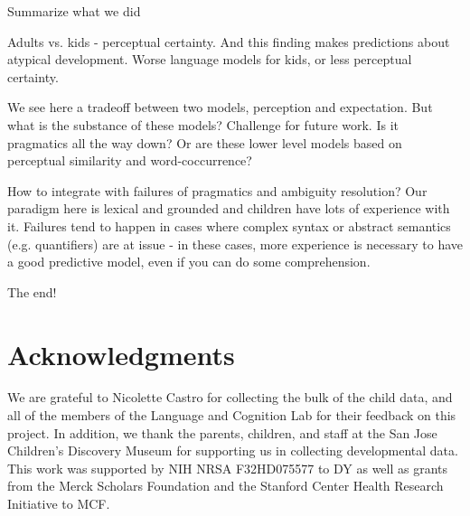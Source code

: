 \documentclass[man,floatsintext]{apa6}
\begin{document}
Summarize what we did

Adults vs. kids - perceptual certainty. And this finding makes predictions about atypical development. Worse language models for kids, or less perceptual certainty. 

We see here a tradeoff between two models, perception and expectation. But what is the substance of these models? Challenge for future work. Is it pragmatics all the way down? Or are these lower level models based on perceptual similarity and word-coccurrence?

How to integrate with failures of pragmatics and ambiguity resolution? Our paradigm here is lexical and grounded and children have lots of experience with it. Failures tend to happen in cases where complex syntax or abstract semantics (e.g. quantifiers) are at issue - in these cases, more experience is necessary to have a good predictive model, even if you can do some comprehension. 

The end!

\section{Acknowledgments}

We are grateful to Nicolette Castro for collecting the bulk of the child data, and all of the members of the Language and Cognition Lab for their feedback on this project. In addition, we thank the parents, children, and staff at the San Jose Children's Discovery Museum for supporting us in collecting developmental data. This work was supported by NIH NRSA F32HD075577 to DY as well as grants from the Merck Scholars Foundation and the Stanford Center Health Research Initiative to MCF.



\end{document}
